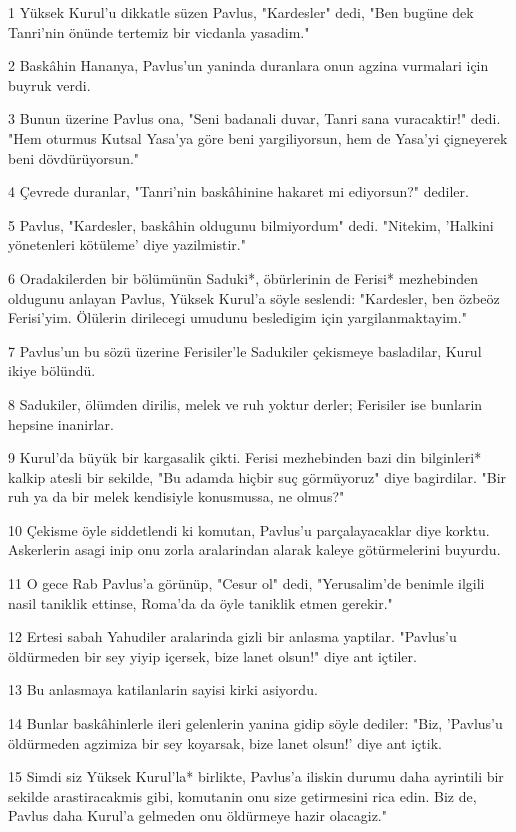 \par 1 Yüksek Kurul'u dikkatle süzen Pavlus, "Kardesler" dedi, "Ben bugüne dek Tanri'nin önünde tertemiz bir vicdanla yasadim."
\par 2 Baskâhin Hananya, Pavlus'un yaninda duranlara onun agzina vurmalari için buyruk verdi.
\par 3 Bunun üzerine Pavlus ona, "Seni badanali duvar, Tanri sana vuracaktir!" dedi. "Hem oturmus Kutsal Yasa'ya göre beni yargiliyorsun, hem de Yasa'yi çigneyerek beni dövdürüyorsun."
\par 4 Çevrede duranlar, "Tanri'nin baskâhinine hakaret mi ediyorsun?" dediler.
\par 5 Pavlus, "Kardesler, baskâhin oldugunu bilmiyordum" dedi. "Nitekim, 'Halkini yönetenleri kötüleme' diye yazilmistir."
\par 6 Oradakilerden bir bölümünün Saduki*, öbürlerinin de Ferisi* mezhebinden oldugunu anlayan Pavlus, Yüksek Kurul'a söyle seslendi: "Kardesler, ben özbeöz Ferisi'yim. Ölülerin dirilecegi umudunu besledigim için yargilanmaktayim."
\par 7 Pavlus'un bu sözü üzerine Ferisiler'le Sadukiler çekismeye basladilar, Kurul ikiye bölündü.
\par 8 Sadukiler, ölümden dirilis, melek ve ruh yoktur derler; Ferisiler ise bunlarin hepsine inanirlar.
\par 9 Kurul'da büyük bir kargasalik çikti. Ferisi mezhebinden bazi din bilginleri* kalkip atesli bir sekilde, "Bu adamda hiçbir suç görmüyoruz" diye bagirdilar. "Bir ruh ya da bir melek kendisiyle konusmussa, ne olmus?"
\par 10 Çekisme öyle siddetlendi ki komutan, Pavlus'u parçalayacaklar diye korktu. Askerlerin asagi inip onu zorla aralarindan alarak kaleye götürmelerini buyurdu.
\par 11 O gece Rab Pavlus'a görünüp, "Cesur ol" dedi, "Yerusalim'de benimle ilgili nasil taniklik ettinse, Roma'da da öyle taniklik etmen gerekir."
\par 12 Ertesi sabah Yahudiler aralarinda gizli bir anlasma yaptilar. "Pavlus'u öldürmeden bir sey yiyip içersek, bize lanet olsun!" diye ant içtiler.
\par 13 Bu anlasmaya katilanlarin sayisi kirki asiyordu.
\par 14 Bunlar baskâhinlerle ileri gelenlerin yanina gidip söyle dediler: "Biz, 'Pavlus'u öldürmeden agzimiza bir sey koyarsak, bize lanet olsun!' diye ant içtik.
\par 15 Simdi siz Yüksek Kurul'la* birlikte, Pavlus'a iliskin durumu daha ayrintili bir sekilde arastiracakmis gibi, komutanin onu size getirmesini rica edin. Biz de, Pavlus daha Kurul'a gelmeden onu öldürmeye hazir olacagiz."
